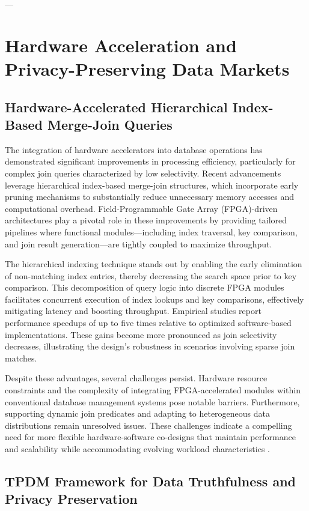 \documentclass[11pt]{article}
\begin{document}
---

\section{Hardware Acceleration and Privacy-Preserving Data Markets}

\subsection{Hardware-Accelerated Hierarchical Index-Based Merge-Join Queries}

The integration of hardware accelerators into database operations has demonstrated significant improvements in processing efficiency, particularly for complex join queries characterized by low selectivity. Recent advancements leverage hierarchical index-based merge-join structures, which incorporate early pruning mechanisms to substantially reduce unnecessary memory accesses and computational overhead. Field-Programmable Gate Array (FPGA)-driven architectures play a pivotal role in these improvements by providing tailored pipelines where functional modules—including index traversal, key comparison, and join result generation—are tightly coupled to maximize throughput.

The hierarchical indexing technique stands out by enabling the early elimination of non-matching index entries, thereby decreasing the search space prior to key comparison. This decomposition of query logic into discrete FPGA modules facilitates concurrent execution of index lookups and key comparisons, effectively mitigating latency and boosting throughput. Empirical studies report performance speedups of up to five times relative to optimized software-based implementations. These gains become more pronounced as join selectivity decreases, illustrating the design’s robustness in scenarios involving sparse join matches. 

Despite these advantages, several challenges persist. Hardware resource constraints and the complexity of integrating FPGA-accelerated modules within conventional database management systems pose notable barriers. Furthermore, supporting dynamic join predicates and adapting to heterogeneous data distributions remain unresolved issues. These challenges indicate a compelling need for more flexible hardware-software co-designs that maintain performance and scalability while accommodating evolving workload characteristics \cite{ref24}.

\subsection{TPDM Framework for Data Truthfulness and Privacy Preservation}
\end{document}
